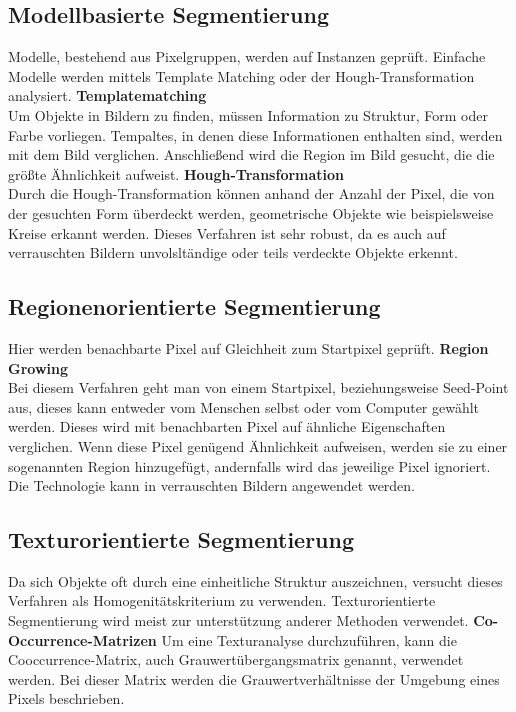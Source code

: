    \subsection*{Modellbasierte Segmentierung} 
    Modelle, bestehend aus Pixelgruppen, werden auf Instanzen geprüft. Einfache Modelle werden mittels Template Matching oder der Hough-Transformation analysiert. \cite{Seg_modell}
    \textbf{Templatematching}\\
    Um Objekte in Bildern zu finden, müssen Information zu Struktur, Form oder Farbe vorliegen. Tempaltes, in denen diese Informationen enthalten sind, werden mit dem Bild verglichen. Anschließend wird die Region im Bild gesucht, die die größte Ähnlichkeit aufweist.
    \textbf{Hough-Transformation}\\
    Durch die Hough-Transformation können anhand der Anzahl der Pixel, die von der gesuchten Form überdeckt werden, geometrische Objekte wie beispielsweise Kreise erkannt werden. Dieses Verfahren ist sehr robust, da es auch auf verrauschten Bildern unvolsltändige oder teils verdeckte Objekte erkennt.

    \subsection*{Regionenorientierte Segmentierung} 
    Hier werden benachbarte Pixel auf Gleichheit zum Startpixel geprüft. \cite{Seg_region}
    \textbf{Region Growing}\\ 
    Bei diesem Verfahren geht man von einem Startpixel, beziehungsweise Seed-Point aus, dieses kann entweder vom Menschen selbst oder vom Computer gewählt werden. Dieses wird mit benachbarten Pixel auf ähnliche Eigenschaften verglichen. Wenn diese Pixel genügend Ähnlichkeit aufweisen, werden sie zu einer sogenannten Region hinzugefügt, andernfalls wird das jeweilige Pixel ignoriert. Die Technologie kann in verrauschten Bildern angewendet werden.

    \subsection*{Texturorientierte Segmentierung} 
    Da sich Objekte oft durch eine einheitliche Struktur auszeichnen, versucht dieses Verfahren als Homogenitätskriterium zu verwenden. Texturorientierte Segmentierung wird meist zur unterstützung anderer Methoden verwendet. \cite{Seg_textur}
    \textbf{Co-Occurrence-Matrizen}
    Um eine Texturanalyse durchzuführen, kann die Cooccurrence-Matrix, auch Grauwertübergangsmatrix genannt, verwendet werden. \cite{seg_coocc}
    Bei dieser Matrix werden die Grauwertverhältnisse der Umgebung eines Pixels beschrieben.

